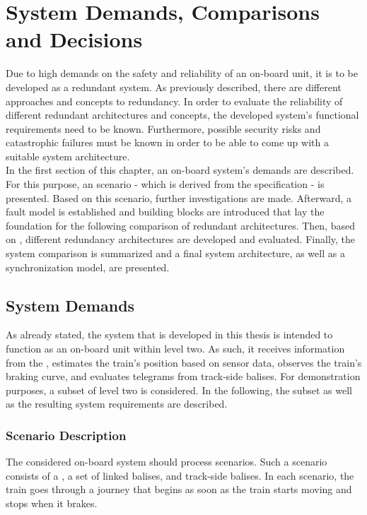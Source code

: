 \chapter{System Demands, Comparisons and Decisions}
\label{chptr:redundantSystemsCompare}
Due to high demands on the safety and reliability of an on-board unit, it is to be developed as a redundant system.
As previously described, there are different approaches and concepts to redundancy.
In order to evaluate the reliability of different redundant architectures and concepts, the developed system's functional requirements need to be known.
Furthermore, possible security risks and catastrophic failures must be known in order to be able to come up with a suitable system architecture.
\\

\noindent
In the first section of this chapter, an  on-board system's demands are described.
For this purpose, an  scenario - which is derived from the  specification - is presented.
Based on this scenario, further investigations are made.
Afterward, a fault model is established and  building blocks are introduced that lay the foundation for the following comparison of redundant architectures.
Then, based on , different redundancy architectures are developed and evaluated.
Finally, the system comparison is summarized and a final system architecture, as well as a synchronization model, are presented.

\section{System Demands}
As already stated, the system that is developed in this thesis is intended to function as an on-board unit within  level two.
As such, it receives information from the , estimates the train's position based on sensor data, observes the train's braking curve, and evaluates telegrams from track-side balises.
For demonstration purposes, a subset of  level two is considered.
In the following, the  subset as well as the resulting system requirements are described.

\subsection{Scenario Description}
\label{sec:ScenarioDescription}

The considered on-board system should process  scenarios.
Such a scenario consists of a , a set of linked balises, and track-side balises.
In each scenario, the train goes through a journey that begins as soon as the train starts moving and stops when it brakes.
\\

